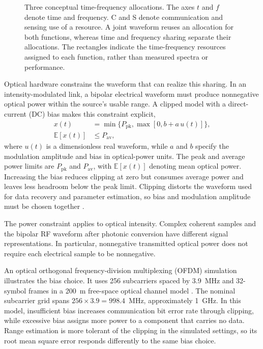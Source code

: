 \begin{figure}[!t]
\centering

\caption{Three conceptual time-frequency allocations. The axes $t$ and $f$
denote time and frequency. C and S denote
communication and sensing use of a resource. A joint waveform reuses an
allocation for both functions, whereas time and frequency sharing separate
their allocations. The rectangles indicate the time-frequency resources
assigned to each function, rather than measured spectra or performance.}
\label{fig:resource_sharing}
\end{figure}

Optical hardware constrains the waveform that can realize this sharing.
In an intensity-modulated link, a bipolar electrical waveform must produce
nonnegative optical power within the source's usable range. A clipped model
with a direct-current (DC) bias makes this constraint explicit,
\begin{equation}
\begin{aligned}
x(t)&=\min\{P_{\mathrm{pk}},\max[0,b+a\,u(t)]\},\\
\mathbb{E}[x(t)]&\leq P_{\mathrm{av}},
\end{aligned}
\label{eq:optical_power_constraints}
\end{equation}
where $u(t)$ is a dimensionless real waveform, while $a$ and $b$ specify the
modulation amplitude and bias in optical-power units. The peak and average
power limits are $P_{\mathrm{pk}}$ and $P_{\mathrm{av}}$, with
$\mathbb{E}[x(t)]$ denoting mean optical power. Increasing the bias reduces
clipping at zero but consumes average power and leaves less headroom below
the peak limit. Clipping distorts the waveform used for data recovery and
parameter estimation, so bias and modulation amplitude must be chosen together
\cite{Wen2024OISACArchitectures}.

The power constraint applies to optical intensity. Complex coherent samples
and the bipolar RF waveform after photonic conversion have different signal
representations. In particular, nonnegative transmitted optical power does
not require each electrical sample to be nonnegative.

An optical orthogonal frequency-division multiplexing (OFDM) simulation
illustrates the bias choice. It uses 256 subcarriers spaced by 3.9~MHz and
32-symbol frames in a 200~m free-space optical channel model
\cite{Wen2024OISACArchitectures}. The nominal subcarrier grid spans
$256\times3.9=998.4$~MHz, approximately 1~GHz.
In this model, insufficient bias increases communication bit error rate
through clipping, while excessive bias assigns more power to a component
that carries no data. Range estimation is more tolerant of the clipping
in the simulated settings, so its root mean square error responds differently
to the same bias choice.


